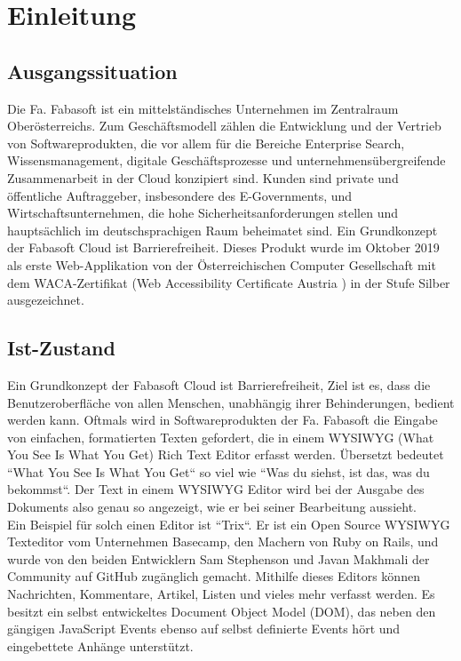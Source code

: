 \chapter{Einleitung}
\section{Ausgangssituation}
Die Fa. Fabasoft ist ein mittelständisches Unternehmen im Zentralraum Oberösterreichs. Zum Geschäftsmodell zählen die Entwicklung und der Vertrieb von Softwareprodukten, die vor allem für die Bereiche Enterprise Search, Wissensmanagement, digitale Geschäftsprozesse und unternehmensübergreifende Zusammenarbeit in der Cloud konzipiert sind. Kunden sind private und öffentliche Auftraggeber, insbesondere des E-Governments, und Wirtschaftsunternehmen, die hohe Sicherheitsanforderungen stellen und hauptsächlich im deutschsprachigen Raum beheimatet sind. Ein Grundkonzept der Fabasoft Cloud ist Barrierefreiheit. Dieses Produkt wurde im Oktober 2019 als erste Web-Applikation von der Österreichischen Computer Gesellschaft mit dem WACA-Zertifikat (Web Accessibility Certificate Austria \cite{waca_zertifikate_2020}) in der Stufe Silber ausgezeichnet.

\section{Ist-Zustand}
Ein Grundkonzept der Fabasoft Cloud ist Barrierefreiheit, Ziel ist es, dass die Benutzeroberfläche von allen Menschen, unabhängig ihrer Behinderungen, bedient werden kann.
Oftmals wird in Softwareprodukten der Fa. Fabasoft die Eingabe von einfachen, formatierten Texten gefordert, die in einem WYSIWYG (What You See Is What You Get) Rich Text Editor erfasst werden. 
Übersetzt bedeutet ``What You See Is What You Get`` so viel wie ``Was du siehst, ist das, was du bekommst``. Der Text in einem WYSIWYG Editor wird bei der Ausgabe des Dokuments also genau so angezeigt, wie er bei seiner Bearbeitung aussieht.\\
Ein Beispiel für solch einen Editor ist ``Trix``. Er ist ein Open Source WYSIWYG Texteditor vom Unternehmen Basecamp, den Machern von Ruby on Rails, und wurde von den beiden Entwicklern Sam Stephenson und Javan Makhmali der Community auf GitHub \cite{basecamp_trix_2013} zugänglich gemacht. Mithilfe dieses Editors können Nachrichten, Kommentare, Artikel, Listen und vieles mehr verfasst werden. Es besitzt ein selbst entwickeltes Document Object Model (DOM), das neben den gängigen JavaScript Events ebenso auf selbst definierte Events hört und eingebettete Anhänge unterstützt.

